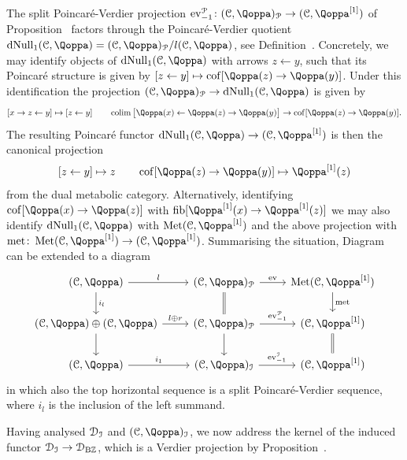 \begin{remark}
\label{rem:variant}%
\label{remark:dmet}%
The split Poincaré-Verdier projection $\ev^{\cP}_{-1}\colon (\C,\QF)_{\mathcal{P}} \to (\C,\QF\qshift{1})$ of Proposition~ factors through the Poincaré-Verdier quotient $\dMet_1(\C,\QF)=(\C,\QF)_{\cP}/l(\C,\QF)$,
see Definition~. Concretely, we may identify objects of $\dMet_1(\C,\QF)$ with arrows $z \leftarrow y$, such that its Poincaré structure is given by $[z \leftarrow y]\mapsto \cof[\QF(z) \to \QF(y)]$. Under this identification the projection $(\C,\QF)_{\cP} \to \dMet_1(\C,\QF)$ is given by
\[
[x \rightarrow z \leftarrow y] \mapsto [z \leftarrow y] \quad\quad \colim\big[\QF(x) \leftarrow \QF(z) \rightarrow \QF(y)\big]  \to \cof[\QF(z) \to \QF(y)] .
\]
The resulting Poincaré functor $\dMet_1(\C,\QF) \to (\C,\QF\qshift{1})$ is then the canonical projection 
\[
[z \leftarrow y] \mapsto z \quad\quad \cof[\QF(z) \to \QF(y)] \mapsto \QF\qshift{1}(z)
\]
from the dual metabolic category. Alternatively, identifying $\cof[\QF(x) \to \QF(z)]$ with $\fib[\QF\qshift{1}(x) \to \QF\qshift{1}(z)]$ we may also identify $\dMet_1(\C,\QF)$ with $\Met(\C,\QF\qshift{1})$ and the above projection with $\met\colon \Met(\C,\QF\qshift{1}) \to (\C,\QF\qshift{1})$. Summarising the situation, Diagram~ can be extended to a diagram
\[
\begin{tikzcd}
	(\C,\QF) \ar[r,"l"] \ar[d,"i_l"] & (\C,\QF)_{\mathcal{P}} \ar[r,"\ev"] \ar[d,equal] & \Met(\C,\QF\qshift{1}) \ar[d,"\met"] \\
	(\C,\QF) \oplus (\C,\QF) \ar[r,"l\oplus r"]\ar[d] & (\C,\QF)_{\mathcal{P}} \ar[d] \ar[r,"\ev^{\cP}_{-1}"] & (\C,\QF\qshift{1}) \ar[d,equal]\\
	(\C,\QF) \ar[r,"i_1"] & (\C,\QF)_\I \ar[r,"\ev^{\I}_{-1}"] & (\C,\QF\qshift{1})
\end{tikzcd}
\]
in which also the top horizontal sequence is a split Poincar\'e-Verdier sequence, where $i_l$ is the inclusion of the left summand. 
\end{remark}









Having analysed $\mathcal{D}_{\mathcal{I}}$ and $(\C,\QF)_\I$, we now address the kernel of the induced functor $\mathcal{D}_{\mathcal{I}} \to \mathcal{D}_{\mathrm{B}\mathbb{Z}}$, which is a Verdier projection by Proposition~.


